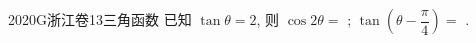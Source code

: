 
\begin{problem}{2020}{G}{浙江卷}{13}{三角函数}
已知 $ \tan\theta=2 $, 则 $ \cos 2\theta= $ \underline{\hspace{4em}}; $ \tan\left(\theta-\dfrac{\pi}{4}\right)= $ \underline{\hspace{4em}}.
\end{problem}

\begin{answer}

\end{answer}

\begin{solutions}

\end{solutions}